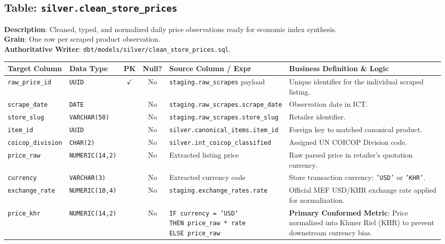 \documentclass[a4paper, 11pt]{article}
\begin{document}
\newpage
\subsection{Table: \texttt{silver.clean\_store\_prices}}
\textbf{Description}: Cleaned, typed, and normalized daily price observations ready for economic index synthesis. \\
\textbf{Grain}: One row per scraped product observation. \\
\textbf{Authoritative Writer}: \texttt{dbt/models/silver/clean\_store\_prices.sql}.

\begin{table}[H]
\centering
\small
\begin{tabularx}{\textwidth}{l p{2.5cm} c c p{4.2cm} X}
\toprule
\textbf{Target Column} & \textbf{Data Type} & \textbf{PK} & \textbf{Null?} & \textbf{Source Column / Expr} & \textbf{Business Definition \& Logic} \\
\midrule
\texttt{raw\_price\_id} & \texttt{UUID} & $\checkmark$ & No & \texttt{staging.raw\_scrapes} payload & Unique identifier for the individual scraped listing. \\
\texttt{scrape\_date} & \texttt{DATE} & & No & \texttt{staging.raw\_scrapes.scrape\_date} & Observation date in ICT. \\
\texttt{store\_slug} & \texttt{VARCHAR(50)} & & No & \texttt{staging.raw\_scrapes.store\_slug} & Retailer identifier. \\
\texttt{item\_id} & \texttt{UUID} & & No & \texttt{silver.canonical\_items.item\_id} & Foreign key to matched canonical product. \\
\texttt{coicop\_division} & \texttt{CHAR(2)} & & No & \texttt{silver.int\_coicop\_classified} & Assigned UN COICOP Division code. \\
\texttt{price\_raw} & \texttt{NUMERIC(14,2)} & & No & Extracted listing price & Raw parsed price in retailer's quotation currency. \\
\texttt{currency} & \texttt{VARCHAR(3)} & & No & Extracted currency code & Store transaction currency: \texttt{'USD'} or \texttt{'KHR'}. \\
\texttt{exchange\_rate} & \texttt{NUMERIC(10,4)} & & No & \texttt{staging.exchange\_rates.rate} & Official MEF USD/KHR exchange rate applied for normalization. \\
\texttt{price\_khr} & \texttt{NUMERIC(14,2)} & & No & \makecell[l]{\texttt{IF currency = 'USD'}\\\texttt{THEN price\_raw * rate}\\\texttt{ELSE price\_raw}} & \textbf{Primary Conformed Metric}: Price normalized into Khmer Riel (KHR) to prevent downstream currency bias. \\

\end{tabularx}
\end{table}
\end{document}
